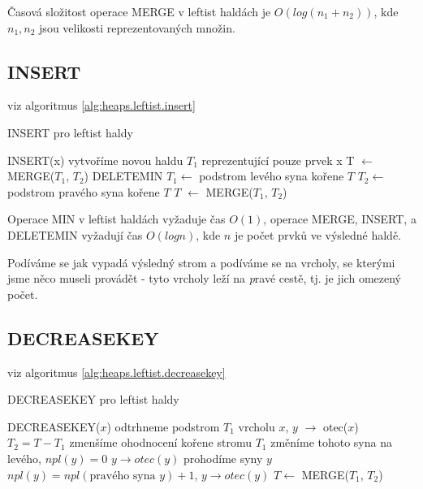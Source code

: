 \begin{pozn}
Časová složitost operace MERGE v leftist haldách je $O(log(n_1+n_2))$, kde
$n_1, n_2$ jsou velikosti reprezentovaných množin.
\end{pozn}

\subsection{INSERT}

viz algoritmus \ref{alg:heaps.leftist.insert}

\begin{algorithm}[!htb]
\caption{INSERT pro leftist haldy}
\label{alg:heaps.leftist.insert}
\begin{algorithmic}
\STATE INSERT(x)
\STATE vytvoříme novou haldu $T_1$ reprezentující pouze prvek x
\STATE T $\leftarrow$ MERGE($T_1$, $T_2$)
\STATE DELETEMIN
\STATE $T_1 \leftarrow$ podstrom levého syna kořene $T$
\STATE $T_2 \leftarrow$ podstrom pravého syna kořene $T$
\STATE $T$ $\leftarrow$ MERGE($T_1$, $T_2$)
\end{algorithmic}
\end{algorithm}

\begin{theorem}
Operace MIN v leftist haldách vyžaduje čas $O(1)$, operace MERGE, INSERT, a
DELETEMIN vyžadují čas $O(log n)$, kde $n$ je počet prvků ve výsledné haldě.
\end{theorem}

\begin{pozn}
Podíváme se jak vypadá výsledný strom a podíváme se na vrcholy, se kterými
jsme něco museli provádět - tyto vrcholy leží na {\emph pravé cestě}, 
tj. je jich omezený počet.
\end{pozn}

\subsection{DECREASEKEY}

viz algoritmus \ref{alg:heaps.leftist.decreasekey}

\begin{algorithm}[!htb]
\caption{DECREASEKEY pro leftist haldy}
\label{alg:heaps.leftist.decreasekey}
\begin{algorithmic}
\STATE DECREASEKEY($x$)
\STATE odtrhneme podstrom $T_1$ vrcholu $x$, $y$ $\rightarrow$ otec($x$)
\STATE $T_2 = T - T_1$
\STATE zmenšíme ohodnocení kořene stromu $T_1$
  \STATE změníme tohoto syna na levého, $npl(y) = 0$
\ENDIF
\STATE $y \rightarrow otec(y)$
    \STATE prohodíme syny $y$
  \ENDIF
  \STATE $npl(y) = npl(\text{pravého syna }y) + 1$, $y \rightarrow otec(y)$
\ENDWHILE
\STATE $T \leftarrow$ MERGE($T_1$, $T_2$)
\end{algorithmic}
\end{algorithm}


